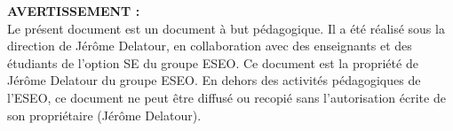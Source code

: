 \noindent
\textbf{AVERTISSEMENT :}\\
Le présent document est un document à but pédagogique. Il a été réalisé sous la direction de Jérôme Delatour, en collaboration avec des enseignants et des étudiants de l'option SE du groupe ESEO. 
Ce document est la propriété de Jérôme Delatour du groupe ESEO. En dehors des activités pédagogiques de l'ESEO, ce document ne peut être diffusé ou recopié sans l’autorisation écrite de son propriétaire (Jérôme Delatour).